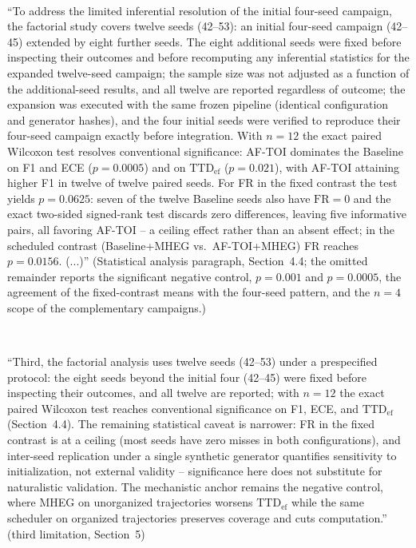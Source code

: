 \documentclass[1p,12pt,authoryear]{elsarticle}
\begin{document}
~

``To address the limited inferential resolution of the initial four-seed campaign, the factorial study covers twelve seeds (42--53): an initial four-seed campaign (42--45) extended by eight further seeds. The eight additional seeds were fixed before inspecting their outcomes and before recomputing any inferential statistics for the expanded twelve-seed campaign; the sample size was not adjusted as a function of the additional-seed results, and all twelve are reported regardless of outcome; the expansion was executed with the same frozen pipeline (identical configuration and generator hashes), and the four initial seeds were verified to reproduce their four-seed campaign exactly before integration. With $n=12$ the exact paired Wilcoxon test resolves conventional significance: AF-TOI dominates the Baseline on F1 and ECE ($p=0.0005$) and on $\mathrm{TTD}_{\mathrm{ef}}$ ($p=0.021$), with AF-TOI attaining higher F1 in twelve of twelve paired seeds. For FR in the fixed contrast the test yields $p=0.0625$: seven of the twelve Baseline seeds also have $\mathrm{FR}=0$ and the exact two-sided signed-rank test discards zero differences, leaving five informative pairs, all favoring AF-TOI -- a ceiling effect rather than an absent effect; in the scheduled contrast (Baseline+MHEG vs.\ AF-TOI+MHEG) FR reaches $p=0.0156$. (...)'' (Statistical analysis paragraph, Section~4.4; the omitted remainder reports the significant negative control, $p=0.001$ and $p=0.0005$, the agreement of the fixed-contrast means with the four-seed pattern, and the $n{=}4$ scope of the complementary campaigns.)

~

``Third, the factorial analysis uses twelve seeds (42--53) under a prespecified protocol: the eight seeds beyond the initial four (42--45) were fixed before inspecting their outcomes, and all twelve are reported; with $n=12$ the exact paired Wilcoxon test reaches conventional significance on F1, ECE, and $\mathrm{TTD}_{\mathrm{ef}}$ (Section~4.4). The remaining statistical caveat is narrower: FR in the fixed contrast is at a ceiling (most seeds have zero misses in both configurations), and inter-seed replication under a single synthetic generator quantifies sensitivity to initialization, not external validity -- significance here does not substitute for naturalistic validation. The mechanistic anchor remains the negative control, where MHEG on unorganized trajectories worsens $\mathrm{TTD}_{\mathrm{ef}}$ while the same scheduler on organized trajectories preserves coverage and cuts computation.'' (third limitation, Section~5)
\end{document}
